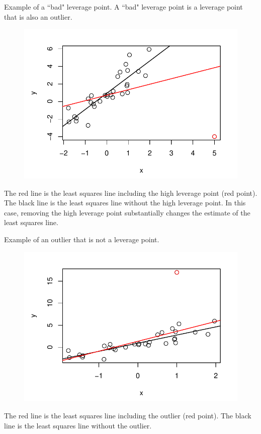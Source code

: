 \documentclass[10pt]{beamer}
\begin{document}
\begin{frame}
Example of a ``bad" leverage point.  A ``bad" leverage point is a leverage point that is also an outlier.

\begin{center}
\begin{figure}
\includegraphics[scale=0.6]{figure/bad_leverage.pdf}
\end{figure}
\end{center}

The red line is the least squares line including the high leverage point (red point).  The black line is the least squares line without the high leverage point.  In this case, removing the high leverage point substantially changes the estimate of the least squares line. 
\end{frame}

\begin{frame}
Example of an outlier that is not a leverage point.

\begin{center}
\begin{figure}
\includegraphics[scale=0.6]{figure/outlier.pdf}
\end{figure}
\end{center}

The red line is the least squares line including the outlier (red point).  The black line is the least squares line without the outlier.  
\end{frame}
\end{document}
